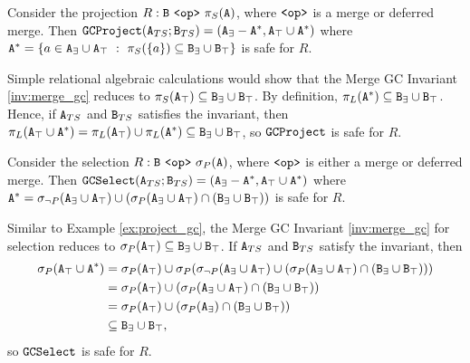 \begin{example}[Project GC]
\label{ex:project_gc}
Consider the projection $R: \tt{B} ~\tt{<op>}~ \pi_S(\tt{A})$, where $\tt{<op>}$ is a merge or deferred merge.
Then $\tt{GCProject}(\tt{A}_{TS}; \tt{B}_{TS}) = (\tt{A}_\exists - \tt{A}^*, \tt{A}_\top \cup \tt{A}^*)$ where $\tt{A}^* = \{a \in \tt{A}_\exists \cup \tt{A}_\top ~:~ \pi_S(\{a\}) \subseteq \tt{B}_\exists \cup \tt{B}_\top\}$
is safe for $R$.
\end{example}
Simple relational algebraic calculations would show that the Merge GC Invariant \ref{inv:merge_gc} reduces to $\pi_S(\tt{A}_\top) \subseteq \tt{B}_\exists \cup \tt{B}_\top$.
By definition, $\pi_L(\tt{A}^*) \subseteq \tt{B}_\exists \cup \tt{B}_\top$.
Hence, if $\tt{A}_{TS}$ and $\tt{B}_{TS}$ satisfies the invariant, then $\pi_L(\tt{A}_\top \cup \tt{A}^*) = \pi_L(\tt{A}_\top) \cup \pi_L(\tt{A}^*) \subseteq \tt{B}_\exists \cup \tt{B}_\top$, so $\tt{GCProject}$ is safe for $R$. 

\begin{example}[Select GC]
Consider the selection $R: \tt{B} ~\tt{<op>}~ \sigma_P(\tt{A})$, where $\tt{<op>}$ is either a merge or deferred merge.
Then $\tt{GCSelect}(\tt{A}_{TS}; \tt{B}_{TS}) = (\tt{A}_\exists - \tt{A}^*, \tt{A}_\top \cup \tt{A}^*)$ where $\tt{A}^* = \sigma_{\neg P}(\tt{A}_\exists \cup \tt{A}_\top) \cup (\sigma_P(\tt{A}_\exists \cup \tt{A}_\top) \cap (\tt{B}_\exists \cup \tt{B}_\top))$ is safe for $R$.
\end{example}
Similar to Example \ref{ex:project_gc}, the Merge GC Invariant \ref{inv:merge_gc} for selection reduces to $\sigma_P(\tt{A}_\top) \subseteq \tt{B}_\exists \cup \tt{B}_\top$.
If $\tt{A}_{TS}$ and $\tt{B}_{TS}$ satisfy the invariant, then
\begin{align*}
\sigma_P(\tt{A}_\top \cup \tt{A}^*)
&= \sigma_P(\tt{A}_\top) \cup \sigma_P(\sigma_{\neg P}(\tt{A}_\exists \cup \tt{A}_\top) \cup (\sigma_P(\tt{A}_\exists \cup \tt{A}_\top) \cap (\tt{B}_\exists \cup \tt{B}_\top)))\\
&= \sigma_P(\tt{A}_\top) \cup (\sigma_P(\tt{A}_\exists \cup \tt{A}_\top) \cap (\tt{B}_\exists \cup \tt{B}_\top))\\
&= \sigma_P(\tt{A}_\top) \cup (\sigma_P(\tt{A}_\exists) \cap (\tt{B}_\exists \cup \tt{B}_\top))\\
&\subseteq \tt{B}_\exists \cup \tt{B}_\top,
\end{align*}
so $\tt{GCSelect}$ is safe for $R$.

